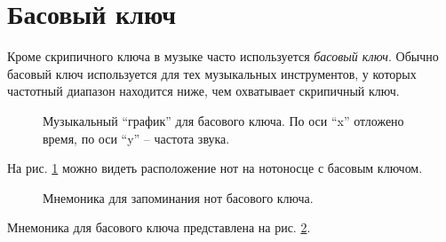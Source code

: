 \documentclass[../sparc.tex]{subfiles}
\begin{document}
\section{Басовый ключ}

Кроме скрипичного ключа в музыке часто используется \emph{басовый ключ}.  Обычно
басовый ключ используется для тех музыкальных инструментов, у которых частотный
диапазон находится ниже, чем охватывает скрипичный ключ.

\begin{figure}[ht]
  \centering
  \caption{Музыкальный ``график'' для басового ключа.  По оси ``x'' отложено
    время, по оси ``y'' -- частота звука.}
  \label{fig:lilypond-bass-clef}
\end{figure}


На рис. \ref{fig:lilypond-bass-clef} можно видеть расположение нот на нотоносце
с басовым ключом.

\begin{figure}[ht]
  \centering
  \caption{Мнемоника для запоминания нот басового ключа.}
  \label{fig:lilypond-bass-clef-mnemonic}
\end{figure}

Мнемоника для басового ключа представлена на
рис. \ref{fig:lilypond-bass-clef-mnemonic}.
\end{document}
